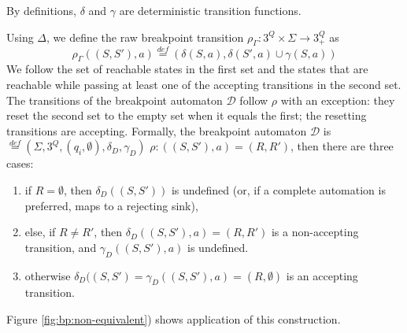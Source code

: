 \documentclass[
	digital
nolof, nolot
]{fithesis3}
\newcommand{\cD}{\mathcal{D}}
\newcommand{\eqdef}{\overset{def}{=}}
\begin{document}
			By definitions, $\delta$ and $\gamma$ are deterministic transition functions.
			
			Using $\Delta$, we define the raw breakpoint transition
			$\rho_\Gamma \colon 3^Q \times \Sigma \rightarrow 3^Q_+$ as
			\[\rho_\Gamma((S, S'), a) \eqdef(\delta(S, a), \delta(S',a)\cup \gamma(S, a))\]
			We follow the set of reachable states in the first set and the states that are reachable while passing at least one of the accepting transitions in the second set.
			The transitions of the breakpoint automaton $\cD$ follow $\rho$ with an exception: they reset the second set to the empty set when it equals the first; the resetting transitions are accepting.
			Formally, the breakpoint automaton $\cD$ is $ \eqdef (\Sigma, 3^Q, (q_i, \emptyset), \delta_D, \gamma_D)$  $\rho\colon ((S, S'), a) = (R, R')$, then there are three cases:
			
			\begin{enumerate}
				\item if $R=\emptyset$, then $\delta_D((S,S'))$ is undefined (or, if a complete automation is preferred, maps to a rejecting sink),
				\item else, if $R \neq R'$, then $\delta_D((S,S'),a)=(R, R')$ is a non-accepting transition,
				and $\gamma_D((S,S'),a)$ is undefined.
				\item otherwise $\delta_D((S,S')=\gamma_D((S,S'),a)=(R, \emptyset)$ is an accepting transition.
			\end{enumerate}
			
			Figure \ref{fig:bp:non-equivalent}) shows application of this construction. 
			
			
		
\end{document}
